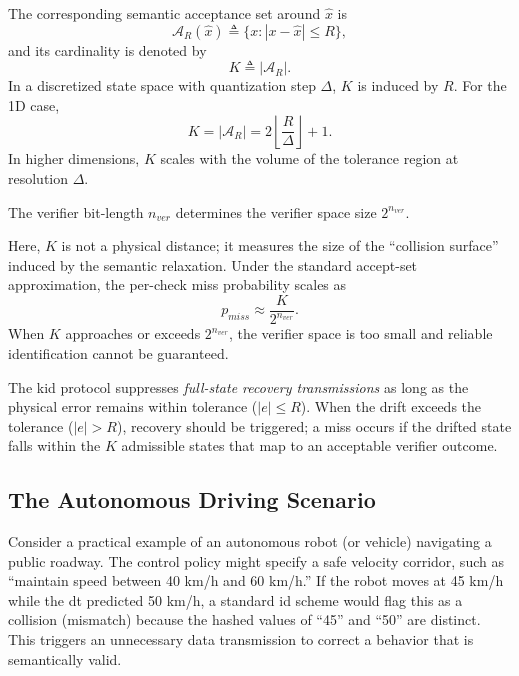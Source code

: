 The corresponding semantic acceptance set around $\hat{x}$ is
\begin{equation}
    \mathcal{A}_R(\hat{x}) \triangleq \{x: |x-\hat{x}|\le R\},
\end{equation}
and its cardinality is denoted by
\begin{equation}
    K \triangleq |\mathcal{A}_R|.
\end{equation}
In a discretized state space with quantization step $\Delta$, $K$ is induced by $R$. For the 1D case,
\begin{equation}
    K = |\mathcal{A}_R| = 2\left\lfloor \frac{R}{\Delta} \right\rfloor + 1.
    \label{eq:kid_K_from_R}
\end{equation}
In higher dimensions, $K$ scales with the volume of the tolerance region at resolution $\Delta$.

The verifier bit-length $n_{ver}$ determines the verifier space size $2^{n_{ver}}$.

Here, $K$ is not a physical distance; it measures the size of the \enquote{collision surface} induced by the semantic relaxation. Under the standard accept-set approximation, the per-check miss probability scales as
\begin{equation}
    p_{miss} \approx \frac{K}{2^{n_{ver}}}.
    \label{eq:pmiss_law}
\end{equation}
When $K$ approaches or exceeds $2^{n_{ver}}$, the verifier space is too small and reliable identification cannot be guaranteed.

The \gls{kid} protocol suppresses \emph{full-state recovery transmissions} as long as the physical error remains within tolerance ($|e|\le R$). When the drift exceeds the tolerance ($|e|>R$), recovery should be triggered; a miss occurs if the drifted state falls within the $K$ admissible states that map to an acceptable verifier outcome.

\subsection{The Autonomous Driving Scenario}
Consider a practical example of an autonomous robot (or vehicle) navigating a public roadway. The control policy might specify a safe velocity corridor, such as ``maintain speed between 40 km/h and 60 km/h.'' If the robot moves at 45 km/h while the \gls{dt} predicted 50 km/h, a standard \gls{id} scheme would flag this as a collision (mismatch) because the hashed values of ``45'' and ``50'' are distinct. This triggers an unnecessary data transmission to correct a behavior that is semantically valid.

